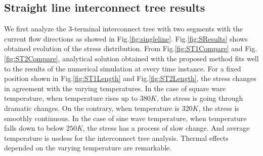 \subsection{Straight line interconnect tree results}
We first analyze the 3-terminal interconnect tree with two segments with the current flow directions as showed in Fig.\ref{fig:singleline}. Fig.\ref{fig:SResults} shows obtained evolution of the stress distribution. From Fig.\ref{fig:ST1Compare} and Fig.\ref{fig:ST2Compare}, analytical solution obtained with the proposed method fits well to the results of the numerical simulation at every time instance. For a fixed position shown in Fig.\ref{fig:ST1Length} and Fig.\ref{fig:ST2Length}, the stress changes in agreement with the varying temperatures. In the case of square ware temperature, when temperature rises up to $380K$, the stress is going through dramatic changes. On the contrary, when temperature is $320K$, the stress is smoothly continuous. In the case of sine wave temperature, when temperature falls down to below $250K$, the stress has a process of slow change. And average temperature is useless for the interconnect tree analysis. Thermal effects depended on the varying temperature are remarkable.
